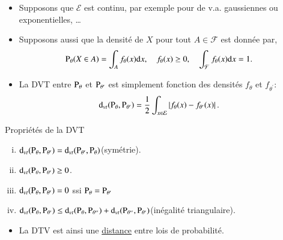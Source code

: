 \begin{frame}
\begin{itemize}
         des fonctions de masse $\prob_\theta$ et $\prob_{\theta^\prime}$: 
         \begin{align*}
            \operatorname{d}_{vt}(\Prob_{\theta}, \Prob_{\theta^\prime}) &= 
            \frac{1}{2}\sum_{x\in\mathcal{E}}\abs{\prob_{\theta}(x) - \prob_{\theta^\prime}(x)}.
         \end{align*}
         \framebreak
         \item  Supposons que $\mathcal{E}$ est continu, par exemple pour de v.a. gaussiennes ou exponentielles, \ldots
         \item Supposons aussi que la densité de $X$ pour tout $A\in \mathcal{F}$ est donnée par,
         \begin{align*}
             \operatorname{P}_\theta(X\in A) &= \int_A f_\theta(x)\mathrm{d}x, 
              \quad f_\theta(x) \geq 0, \quad \int_\mathcal{F}f_\theta(x)\mathrm{d}x = 1.
         \end{align*}
         \item La DVT entre $\operatorname{P}_\theta$ et $\operatorname{P}_{\theta^\prime}$ est simplement fonction 
         des densités $f_\theta$ et $f_{\theta^\prime}$: 
         \begin{align*}
            \operatorname{d}_{vt}(\operatorname{P}_{\theta}, \operatorname{P}_{\theta^\prime}) &= 
            \frac{1}{2}\int_{x\in\mathcal{E}}\left\vert {f_{\theta}(x) - f_{\theta^\prime}(x)} \right\vert.
         \end{align*}
        \end{itemize}
    \end{frame}
    \begin{frame}[allowframebreaks]{Propriétés de la DVT}
        \begin{enumerate}[i)]
            \item  $\operatorname{d}_{vt}(\operatorname{P}_\theta, \operatorname{P}_{\theta^\prime}) 
             = \operatorname{d}_{vt}( \operatorname{P}_{\theta^\prime}, \operatorname{P}_\theta)$(symétrie).
            \item $\operatorname{d}_{vt}(\operatorname{P}_\theta, \operatorname{P}_{\theta^\prime})\geq 0$.
            \item $\operatorname{d}_{vt}(\operatorname{P}_\theta, \operatorname{P}_{\theta^\prime}) = 0$ ssi $\operatorname{P}_\theta = \operatorname{P}_{\theta^\prime}$
            \item $\operatorname{d}_{vt}(\operatorname{P}_\theta, \operatorname{P}_{\theta^\prime}) \leq \operatorname{d}_{vt}(\operatorname{P}_\theta, \operatorname{P}_{\theta^{\prime\prime}})
             + \operatorname{d}_{vt}( \operatorname{P}_{\theta^{\prime\prime}}, \operatorname{P}_{\theta^\prime})$(inégalité triangulaire).
        \end{enumerate}
        \begin{itemize}
            \item La DTV est ainsi une \href{https://fr.wikipedia.org/wiki/Distance_(math\%C3\%A9matiques)}{distance} entre lois de probabilité.
        \end{itemize}
\end{frame}

